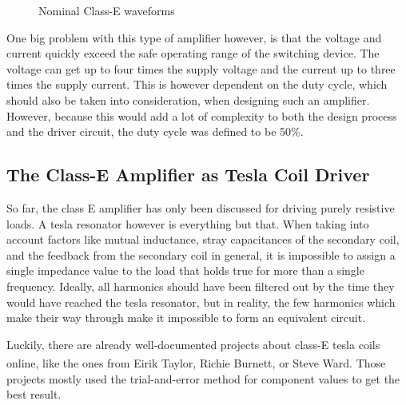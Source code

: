 \begin{figure}[h!]
    \centering
    \caption{Nominal Class-E waveforms}
    \label{fig:nominal-waveforms}
\end{figure}

One big problem with this type of amplifier however, is that the voltage and current quickly exceed the safe operating range of the switching device. The voltage can get up to four times the supply voltage and the current up to three times the supply current. This is however dependent on the duty cycle, which should also be taken into consideration, when designing such an amplifier. However, because this would add a lot of complexity to both the design process and the driver circuit, the duty cycle was defined to be 50\%.

\subsection{The Class-E Amplifier as Tesla Coil Driver}

So far, the class E amplifier has only been discussed for driving purely resistive loads. A tesla resonator however is everything but that. When taking into account factors like mutual inductance, stray capacitances of the secondary coil, and the feedback from the secondary coil in general, it is impossible to assign a single impedance value to the load that holds true for more than a single frequency. Ideally, all harmonics should have been filtered out by the time they would have reached the tesla resonator, but in reality, the few harmonics which make their way through make it impossible to form an equivalent circuit.

Luckily, there are already well-documented projects about class-E tesla coils online, like the ones from Eirik Taylor\textsuperscript{}, Richie Burnett\textsuperscript{}, or Steve Ward\textsuperscript{}. Those projects mostly used the trial-and-error method for component values to get the best result.

